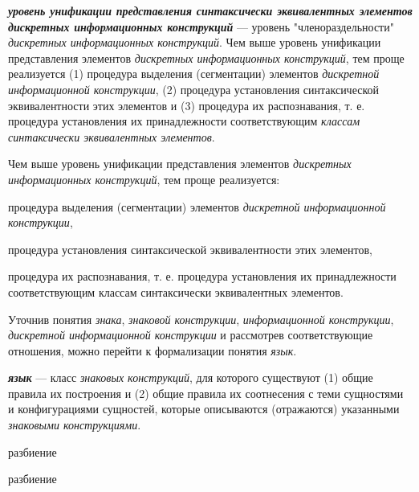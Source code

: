 \textit{\textbf{уровень унификации представления синтаксически эквивалентных элементов дискретных информационных конструкций\scnsupergroupsign}} --- уровень "членораздельности"{} \textit{дискретных информационных конструкций}.
Чем выше уровень унификации представления элементов \textit{дискретных информационных конструкций}, тем проще реализуется (1) процедура выделения (сегментации) элементов \textit{дискретной информационной конструкции}, (2) процедура установления синтаксической эквивалентности этих элементов и (3) процедура их распознавания, т. е. процедура установления их принадлежности соответствующим \textit{классам синтаксически эквивалентных элементов}.

Чем выше уровень унификации представления элементов \textit{дискретных информационных конструкций}, тем проще реализуется:
\begin{textitemize}
    \item процедура выделения (сегментации) элементов \textit{дискретной информационной конструкции},
    \item процедура установления синтаксической эквивалентности этих элементов,
    \item процедура их распознавания, т. е. процедура установления их принадлежности соответствующим классам синтаксически эквивалентных элементов.
\end{textitemize}

Уточнив понятия \textit{знака}, \textit{знаковой конструкции}, \textit{информационной конструкции}, \textit{дискретной информационной конструкции} и рассмотрев соответствующие отношения, можно перейти к формализации понятия \textit{язык}.

\textit{\textbf{язык}} --- класс \textit{знаковых конструкций}, для которого существуют (1) общие правила их построения и (2) общие правила их соотнесения с теми сущностями и конфигурациями сущностей, которые описываются (отражаются) указанными \textit{знаковыми конструкциями}.

\begin{SCn}

    \begin{scnrelfromset}{разбиение}
        \begin{scnindent}
	        \begin{scnrelfromset}{разбиение}
    	    \end{scnrelfromset}
	    \end{scnindent}
    \end{scnrelfromset}

\end{SCn}

